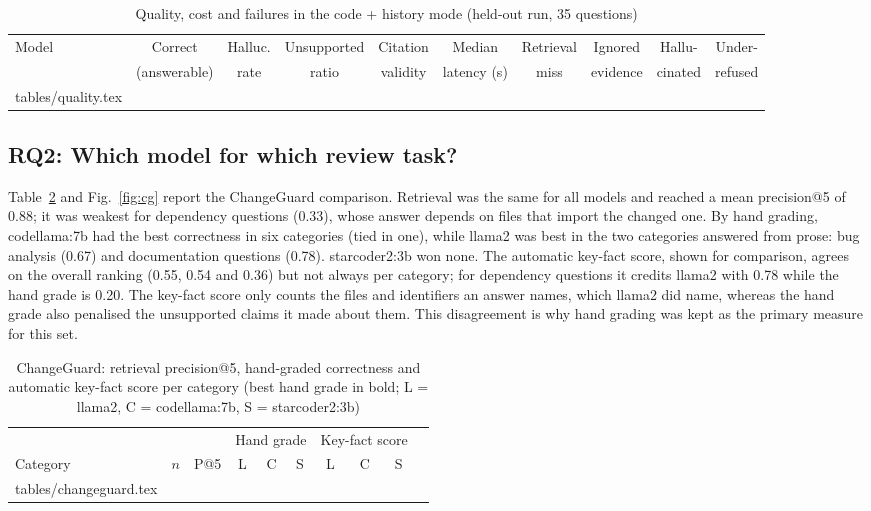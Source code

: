 \documentclass[12pt,onecolumn,draftclsnofoot]{IEEEtran}
\makeatletter
\newcommand{\tablerows}[1]{\@@input #1 }
\makeatother
\begin{document}
\begin{table}[!t]
\caption{Quality, cost and failures in the code + history mode (held-out run, 35 questions)}
\label{tab:quality}
\centering
\scriptsize
\setlength{\tabcolsep}{3.5pt}
\begin{tabular}{@{}lccccccccc@{}}
\toprule
Model & Correct & Halluc. & Unsupported & Citation & Median & Retrieval & Ignored & Hallu- & Under- \\
 & (answerable) & rate & ratio & validity & latency (s) & miss & evidence & cinated & refused \\
\midrule
\tablerows{tables/quality.tex}
\end{tabular}
\end{table}

\subsection{RQ2: Which model for which review task?}
Table~\ref{tab:cg} and Fig.~\ref{fig:cg} report the ChangeGuard comparison. Retrieval was the same for all models and reached a mean precision@5 of 0.88; it was weakest for dependency questions (0.33), whose answer depends on files that import the changed one. By hand grading, codellama:7b had the best correctness in six categories (tied in one), while llama2 was best in the two categories answered from prose: bug analysis (0.67) and documentation questions (0.78). starcoder2:3b won none. The automatic key-fact score, shown for comparison, agrees on the overall ranking (0.55, 0.54 and 0.36) but not always per category; for dependency questions it credits llama2 with 0.78 while the hand grade is 0.20. The key-fact score only counts the files and identifiers an answer names, which llama2 did name, whereas the hand grade also penalised the unsupported claims it made about them. This disagreement is why hand grading was kept as the primary measure for this set.

\begin{table}[!t]
\caption{ChangeGuard: retrieval precision@5, hand-graded correctness and automatic key-fact score per category (best hand grade in bold; L = llama2, C = codellama:7b, S = starcoder2:3b)}
\label{tab:cg}
\centering
\scriptsize
\setlength{\tabcolsep}{4pt}
\begin{tabular}{@{}lccccccccc@{}}
\toprule
& & & \multicolumn{3}{c}{Hand grade} & \multicolumn{3}{c}{Key-fact score} \\
\cmidrule(lr){4-6}\cmidrule(lr){7-9}
Category & $n$ & P@5 & L & C & S & L & C & S \\
\midrule
\tablerows{tables/changeguard.tex}
\end{tabular}
\end{table}
\end{document}
